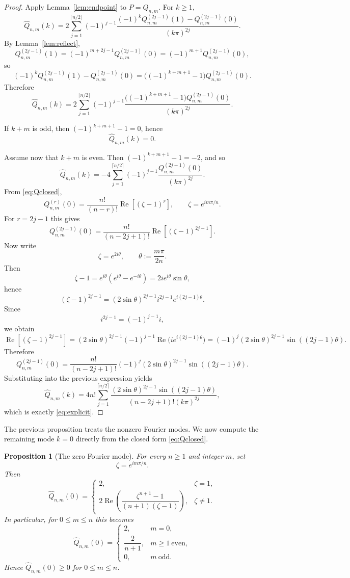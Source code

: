 \documentclass[10pt,a4paper]{amsart}
\newtheorem{proposition}[theorem]{Proposition}
\DeclareMathOperator{\RealPart}{Re}
\renewcommand{\Re}{\RealPart}
\begin{document}
\begin{proof}
Apply Lemma~\ref{lem:endpoint} to $P=Q_{n,m}$. For $k\ge1$,
\[
\widehat Q_{n,m}(k)
=
2 \sum_{j=1}^{\lceil n/2 \rceil} (-1)^{j-1}
\frac{ 
(-1)^k Q_{n,m}^{(2j-1)}(1) - Q_{n,m}^{(2j-1)}(0) 
}{ 
(k\pi)^{2j} 
}.
\]
By Lemma~\ref{lem:reflect},
\[
Q_{n,m}^{(2j-1)}(1)
=
(-1)^{m+2j-1} Q_{n,m}^{(2j-1)}(0)
=
(-1)^{m+1} Q_{n,m}^{(2j-1)}(0),
\]
so
\[
(-1)^k Q_{n,m}^{(2j-1)}(1) - Q_{n,m}^{(2j-1)}(0)
=
\bigl( (-1)^{k+m+1}-1 \bigr) Q_{n,m}^{(2j-1)}(0).
\]
Therefore
\[
\widehat Q_{n,m}(k)
=
2 \sum_{j=1}^{ \lceil n/2\rceil }(-1)^{j-1}
\frac{ 
\bigl((-1)^{k+m+1}-1\bigr) Q_{n,m}^{(2j-1)}(0)
}{
(k\pi)^{2j}
}.
\]

If $k+m$ is odd, then $(-1)^{k+m+1}-1=0$, hence
\[
\widehat Q_{n,m}(k) = 0.
\]

Assume now that $k+m$ is even. Then $(-1)^{k+m+1}-1=-2$, and so
\[
\widehat Q_{n,m}(k)
=
-4 \sum_{j=1}^{\lceil n/2\rceil}(-1)^{j-1}
\frac{ Q_{n,m}^{(2j-1)}(0) }{ (k\pi)^{2j} }.
\]
From \eqref{eq:Qclosed},
\[
Q_{n,m}^{(r)}(0)
=
\frac{n!}{(n-r)!}\Re[(\zeta-1)^r],
\qquad
\zeta = e^{im\pi/n}.
\]
For $r = 2j-1$ this gives
\[
Q_{n,m}^{(2j-1)}(0)
=
\frac{n!}{(n-2j+1)!}\Re[(\zeta-1)^{2j-1}].
\]
Now write
\[
\zeta=e^{2i\theta},
\qquad
\theta:=\frac{m\pi}{2n}.
\]
Then
\[
\zeta-1
=
e^{i\theta}(e^{i\theta}-e^{-i\theta})
=
2i e^{i\theta}\sin\theta,
\]
hence
\[
(\zeta-1)^{2j-1}
=
(2\sin\theta)^{2j-1} i^{2j-1} e^{i(2j-1)\theta}.
\]
Since
\[
i^{2j-1}=(-1)^{j-1} i,
\]
we obtain
\[
\Re[(\zeta-1)^{2j-1}]
=
(2\sin\theta)^{2j-1} (-1)^{j-1} \Re\bigl(i e^{i(2j-1)\theta}\bigr)
=
(-1)^j (2\sin\theta)^{2j-1} \sin((2j-1)\theta).
\]
Therefore
\[
Q_{n,m}^{(2j-1)}(0)
=
\frac{n!}{(n-2j+1)!}
(-1)^j
(2\sin\theta)^{2j-1}\sin((2j-1)\theta).
\]
Substituting into the previous expression yields
\[
\widehat Q_{n,m}(k)
=
4n! \sum_{j=1}^{ \lceil n/2\rceil}
\frac{ (2\sin\theta)^{2j-1}\sin((2j-1)\theta) }
{ (n-2j+1)!(k\pi)^{2j} },
\]
which is exactly \eqref{eq:explicit}.
\end{proof}



The previous proposition treats the nonzero Fourier modes. We now compute the remaining mode $k=0$ directly from the closed form \eqref{eq:Qclosed}.




\begin{proposition}[The zero Fourier mode]
\label{prop:k0}
For every $n\ge1$ and integer $m$, set
\[
\zeta=e^{im\pi/n}.
\]
Then
\[
\widehat Q_{n,m}(0)
=
\begin{cases}
2, & \zeta=1,\\[1ex]
2\Re\!\left(\dfrac{\zeta^{n+1}-1}{(n+1)(\zeta-1)}\right),
& \zeta\ne1.
\end{cases}
\]
In particular, for $0\le m\le n$ this becomes
\[
\widehat Q_{n,m}(0)=
\begin{cases}
2, & m=0,\\[1ex]
\dfrac{2}{n+1}, & m\ge1\ \text{even},\\[1ex]
0, & m\ \text{odd}.
\end{cases}
\]
Hence $\widehat Q_{n,m}(0)\ge0$ for $0\le m\le n$.
\end{proposition}
\end{document}
